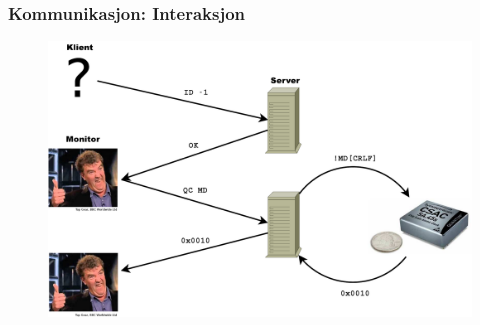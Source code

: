 \documentclass[xcolor=table]{beamer}
\begin{document}
\begin{frame}
  \frametitle{Kommunikasjon: Interaksjon}
    \begin{figure}
      \includegraphics[scale=0.3]{thesis/graphics/monitor_csac_request.pdf}
    \end{figure}
\end{frame}
\end{document}
